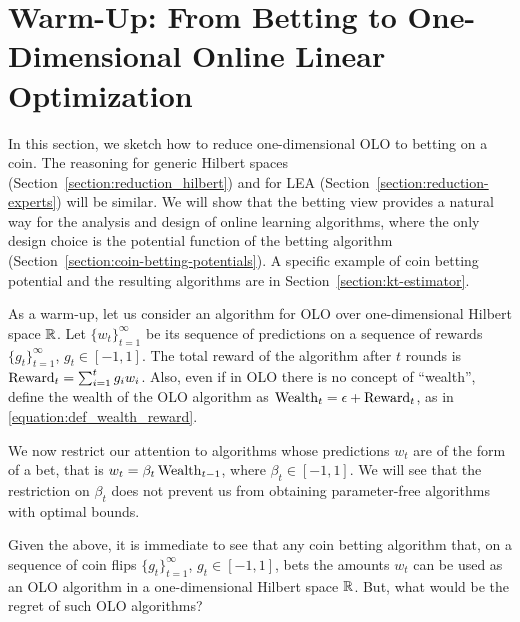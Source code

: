 \section{Warm-Up: From Betting to One-Dimensional Online Linear Optimization}
\label{section:one-dimensional-hilbert-space-olo}

In this section, we sketch how to reduce one-dimensional OLO to betting on a coin. The reasoning for generic Hilbert spaces (Section~\ref{section:reduction_hilbert}) and for LEA (Section~\ref{section:reduction-experts}) will be similar.
We will show that the betting view provides a natural way for the analysis and design of online learning algorithms, where the only design choice is the potential function of the betting algorithm (Section~\ref{section:coin-betting-potentials}).
A specific example of coin betting potential and the resulting algorithms are in Section~\ref{section:kt-estimator}.

As a warm-up, let us consider an algorithm for OLO over one-dimensional Hilbert
space $\mathbb{R}$.  Let $\{w_t\}_{t=1}^\infty$ be its sequence of predictions on a
sequence of rewards $\{g_t\}_{t=1}^\infty$, $g_t \in [-1,1]$. The total reward
of the algorithm after $t$ rounds is $\operatorname{Reward}_t = \sum_{i=1}^t g_i w_i$. Also, even if in OLO there is no concept of ``wealth'', define the wealth of the OLO algorithm as $\operatorname{Wealth}_t = \epsilon +
\operatorname{Reward}_t$, as in \eqref{equation:def_wealth_reward}.

We now restrict our attention to algorithms whose predictions $w_t$ are of the
form of a bet, that is $w_t = \beta_t \operatorname{Wealth}_{t-1}$, where $\beta_t \in
[-1,1]$.  We will see that the restriction on $\beta_t$ does not prevent us
from obtaining parameter-free algorithms with optimal bounds.

Given the above, it is immediate to see that any coin betting algorithm that,
on a sequence of coin flips $\{g_t\}_{t=1}^\infty$, $g_t \in [-1,1]$, bets the
amounts $w_t$ can be used as an OLO algorithm in a one-dimensional Hilbert
space $\mathbb{R}$. But, what would be the regret of such OLO algorithms?

